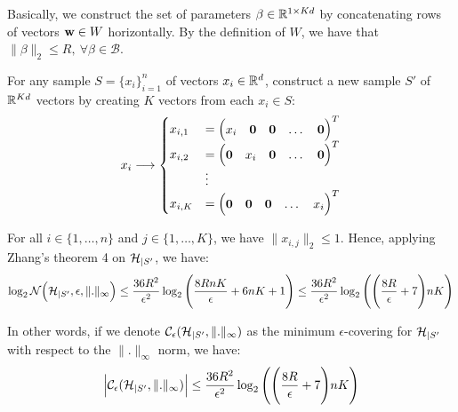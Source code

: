 \noindent Basically, we construct the set of parameters $\beta\in \mathbb{R}^{1\times Kd}$ by concatenating rows of vectors ${\bf w}\in W$ horizontally. By the definition of $W$, we have that $\|\beta\|_2\le R, \ \forall \beta\in\mathcal{B}$.

\noindent\newline\newline For any sample $S=\{x_i\}_{i=1}^n$ of vectors $x_i\in \mathbb{R}^d$, construct a new sample $S'$ of $\mathbb{R}^{Kd}$ vectors by creating $K$ vectors from each $x_i\in S$:
\begin{align*}
    x_i \longrightarrow \begin{cases}
        x_{i, 1} &= \begin{pmatrix} x_i & {\bf 0} & {\bf 0} & \dots & {\bf 0} \end{pmatrix}^T \\
        x_{i, 2} &= \begin{pmatrix} {\bf 0} & x_i & {\bf 0} & \dots & {\bf 0} \end{pmatrix}^T \\
        &\vdots \\
        x_{i, K} &=\begin{pmatrix} {\bf 0} & {\bf 0} & {\bf 0} & \dots & x_i \end{pmatrix}^T
    \end{cases}
\end{align*}

\noindent For all $i\in \{1, \dots, n\}$ and $j\in\{1, \dots, K\}$, we have $\|x_{i, j}\|_2 \le 1$. Hence, applying Zhang's theorem 4 \cite{article:tong_zhang} on $\mathcal{H}_{|S'}$, we have:
\begin{align*}
    \log_2\mathcal{N}\Big( \mathcal{H}_{|S'}, \epsilon, \|.\|_\infty \Big) \le \frac{36R^2}{\epsilon^2}\log_2\Bigg( 
        \frac{8RnK}{\epsilon} + 6nK + 1
     \Bigg) \le \frac{36R^2}{\epsilon^2}\log_2\Bigg( \Bigg( 
        \frac{8R}{\epsilon} + 7 \Bigg)nK
     \Bigg) 
\end{align*}

\noindent In other words, if we denote $\mathcal{C}_\epsilon(\mathcal{H}_{|S'}, \|.\|_\infty)$ as the minimum $\epsilon$-covering for $\mathcal{H}_{|S'}$ with respect to the $\|.\|_\infty$ norm, we have:
\begin{align*}
    \Big| 
        \mathcal{C}_\epsilon(\mathcal{H}_{|S'}, \|.\|_\infty)
     \Big| \le \frac{36R^2}{\epsilon^2}\log_2\Bigg( \Bigg( 
        \frac{8R}{\epsilon} + 7 \Bigg)nK
     \Bigg)
\end{align*}

